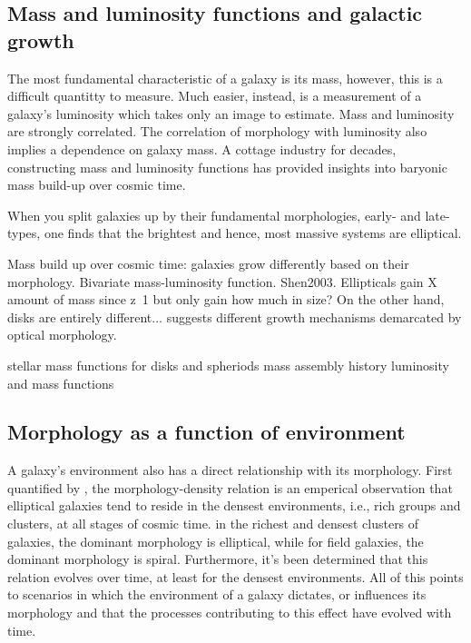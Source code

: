 \subsection{Mass and luminosity functions and galactic growth}
The most fundamental characteristic of a galaxy is its mass, however, this is a difficult quantitty to measure. Much easier, instead, is a measurement of a galaxy's luminosity which takes only an image to estimate. Mass and luminosity are strongly correlated. The correlation of morphology with luminosity also implies a dependence on galaxy mass. A cottage industry for decades, constructing mass and luminosity functions has provided insights into baryonic mass build-up over cosmic time. 

When you split galaxies up by their fundamental morphologies, early- and late-types, one finds that the brightest and hence, most massive systems are elliptical. 

Mass build up over cosmic time: galaxies grow differently based on their morphology. Bivariate mass-luminosity function. Shen2003. Ellipticals gain X amount of mass since z~1 but only gain how much in size? On the other hand, disks are entirely different... suggests different growth mechanisms demarcated by optical morphology. 

stellar mass functions for disks and spheriods \citep{Thanjavur2016,Bell2003}
mass assembly history \citep{Bundy2005, Taylor2015, Brinchmann2000}
luminosity and mass functions \citep{Blanton2003b, Blanton2001}


\subsection{Morphology as a function of environment}
A galaxy's environment also has a direct relationship with its morphology. First quantified by \cite{Dressler1980}, the morphology-density relation is an emperical observation that elliptical galaxies tend to reside in the densest environments, i.e., rich groups and clusters, at all stages of cosmic time. in the richest and densest clusters of galaxies, the dominant morphology is elliptical, while for field galaxies, the dominant morphology is spiral. Furthermore, it's been determined that this relation evolves over time, at least for the densest environments. All of this points to scenarios in which the environment of a galaxy dictates, or influences its morphology and that the processes contributing to this effect have evolved with time. \citep[e.g.,][]{Fasano2000, Shen2003, Smith2005, Peng2010}

